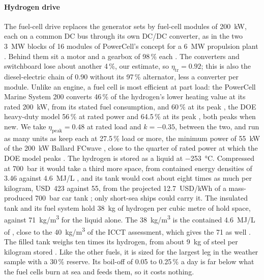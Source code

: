 \paragraph{Hydrogen drive} The fuel-cell drive replaces the generator sets by fuel-cell modules of \SI{200}{kW}, each on a common DC bus through its own DC/DC converter, as in the two \SI{3}{MW} blocks of 16 modules of PowerCell's concept for a \SI{6}{MW} propulsion plant \citep{powercell_ms200}. Behind them sit a motor and a gearbox of 98\,\% each \citep{kanchiralla2022}. The converters and switchboard lose about another 4\,\%, our estimate, so $\eta_\mathrm{tr}=0.92$; this is also the diesel-electric chain of 0.90 without its 97\,\% alternator, less a converter per module. Unlike an engine, a fuel cell is most efficient at part load: the PowerCell Marine System 200 converts 46\,\% of the hydrogen's lower heating value at its rated \SI{200}{kW}, from its stated fuel consumption, and 60\,\% at its peak \citep{powercell_ms200}, the DOE heavy-duty model 56\,\% at rated power and 64.5\,\% at its peak \citep{doe_hdfc2024}, both peaks when new. We take $\eta_\mathrm{peak}=0.48$ at rated load and $k=-0.35$, between the two, and run as many units as keep each at 27.5\,\% load or more, the minimum power of \SI{55}{kW} of the \SI{200}{kW} Ballard FCwave \citep{ballard_fcwave2021}, close to the quarter of rated power at which the DOE model peaks \citep{doe_hdfc2024}. The hydrogen is stored as a liquid at \SI{-253}{\celsius}. Compressed at \SI{700}{bar} it would take a third more space, from contained energy densities of 3.46 against \SI{4.6}{MJ/L} \citep{emsa2023h2}, and its tank would cost about eight times as much per kilogram, USD~423 against 55, from the projected \SI{12.7}{USD/kWh} of a mass-produced \SI{700}{bar} car tank \citep{doe24006storage}; only short-sea ships could carry it. The insulated tank and its fuel system hold \SI{38}{kg} of hydrogen per cubic metre of hold space, against \SI{71}{kg/m^3} for the liquid alone. The \SI{38}{kg/m^3} is the contained \SI{4.6}{MJ/L} of \citet{emsa2023h2}, close to the \SI{40}{kg/m^3} of the ICCT assessment, which gives the 71 as well \citep{mao2020icct}. The filled tank weighs ten times its hydrogen, from about \SI{9}{kg} of steel per kilogram stored \citep{irena2022carriers}. Like the other fuels, it is sized for the largest leg in the weather sample with a 30\,\% reserve. Its boil-off of 0.05 to 0.25\,\% a day \citep{irena2022carriers} is far below what the fuel cells burn at sea and feeds them, so it costs nothing.

